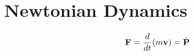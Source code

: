 \section{Newtonian Dynamics}
	\begin{equation}
		\mathbf{F} = \frac{d}{d t} (m \mathbf{v}) = \dot{\mathbf{P}}
		\label{Newton's Force equation}
	\end{equation}

    \lipsum
